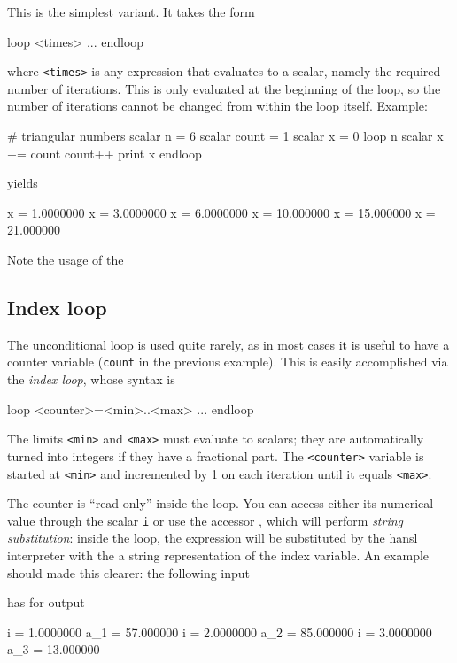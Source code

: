 This is the simplest variant. It takes the form
\begin{code}
loop <times>
   ...
endloop
\end{code}
where \texttt{<times>} is any expression that evaluates to a scalar,
namely the required number of iterations. This is only evaluated at
the beginning of the loop, so the number of iterations cannot be
changed from within the loop itself. Example:
\begin{code}
# triangular numbers
scalar n = 6
scalar count = 1
scalar x = 0
loop n
    scalar x += count
    count++
    print x
endloop
\end{code}
yields
\begin{code}
              x =  1.0000000
              x =  3.0000000
              x =  6.0000000
              x =  10.000000
              x =  15.000000
              x =  21.000000
\end{code}

Note the usage of the 
\subsection{Index loop}

The unconditional loop is used quite rarely, as in most cases it is
useful to have a counter variable (\texttt{count} in the previous
example). This is easily accomplished via the \emph{index loop}, whose
syntax is
\begin{code}
loop <counter>=<min>..<max>
   ...
endloop
\end{code}
The limits \texttt{<min>} and \texttt{<max>} must evaluate to scalars;
they are automatically turned into integers if they have a fractional
part. The \texttt{<counter>} variable is started at \texttt{<min>} and
incremented by 1 on each iteration until it equals \texttt{<max>}.

The counter is ``read-only'' inside the loop. You can access either
its numerical value through the scalar \texttt{i} or use the accessor
, which will perform \emph{string substitution}: inside the
loop, the expression  will be substituted by the hansl
interpreter with the a string representation of the index variable. An
example should made this clearer: the following input
has for output
\begin{code}
    i = 1.0000000
  a_1 = 57.000000
    i = 2.0000000
  a_2 = 85.000000
    i = 3.0000000
  a_3 = 13.000000
\end{code}

